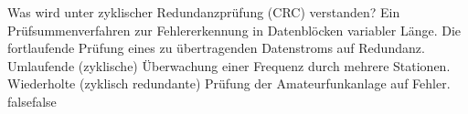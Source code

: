     {Was wird unter zyklischer Redundanzprüfung (CRC) verstanden?}
    {Ein Prüfsummenverfahren zur Fehlererkennung in Datenblöcken variabler Länge.}
    {Die fortlaufende Prüfung eines zu übertragenden Datenstroms auf Redundanz.}
    {Umlaufende (zyklische) Überwachung einer Frequenz durch mehrere Stationen.}
    {Wiederholte (zyklisch redundante) Prüfung der Amateurfunkanlage auf Fehler. }
    {false}{false}